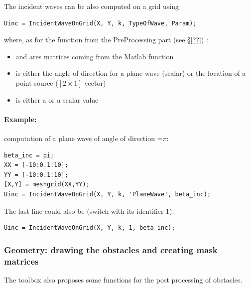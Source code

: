 The incident waves can be also computed on a grid using 
\begin{lstlisting}
Uinc = IncidentWaveOnGrid(X, Y, k, TypeOfWave, Param);
\end{lstlisting}
where, as for the  function from the PreProcessing part (see \S\ref{??}) :
\begin{itemize}
\item {} and  ares matrices coming from the  Matlab function
\item {} is either the angle of direction for a plane wave (scalar) or the location of a point source ($[2\times1]$ vector)
\item {} is either a  or a scalar value 
\end{itemize}
\paragraph{Example:} computation of a plane wave of angle of direction =$\pi$:
\begin{lstlisting}
beta_inc = pi;
XX = [-10:0.1:10];
YY = [-10:0.1:10];
[X,Y] = meshgrid(XX,YY);
Uinc = IncidentWaveOnGrid(X, Y, k, 'PlaneWave', beta_inc);
\end{lstlisting}
The last line could also be (switch  with its identifier $1$):
\begin{lstlisting}
Uinc = IncidentWaveOnGrid(X, Y, k, 1, beta_inc);
\end{lstlisting}

 
\subsubsection{Geometry: drawing the obstacles and creating mask matrices}

The \mudiff toolbox also proposes some functions for the post processing of obstacles. 
